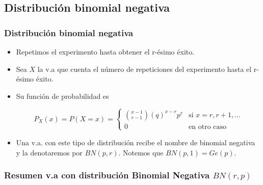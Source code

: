 \documentclass[handout]{beamer}
\renewcommand{\emph}[1]{{\color{red}#1}}
\theoremstyle{plain}
\theoremstyle{definition}
\begin{document}
\subsection{Distribución binomial negativa}
\begin{frame}
\frametitle{Distribución binomial negativa}
\begin{itemize}
\item 
Repetimos el
experimento hasta obtener el r-ésimo éxito. 
\item Sea $X$ la v.a que
cuenta el número de repeticiones del experimento hasta el r-ésimo
éxito. 
\item Su función de probabilidad es

{\scriptsize
     $$P_{X}(x)=P(X=x)=\left\{\begin{array}{ll}
     {{x-1}\choose{r-1}} (q)^{x-r}p^r & \mbox{si } x=r,r+1,\ldots\\
     0 & \mbox{en otro caso}\end{array}\right.$$
}
\item
     Una v.a. con este tipo de distribución recibe el nombre de \emph{binomial negativa} y la denotaremos por $BN(p,r)$. Notemos que $BN(p,1)=Ge(p)$.
\end{itemize}

\end{frame}
\subsubsection{Resumen v.a con distribución Binomial Negativa $BN(r,p)$}
\end{document}
